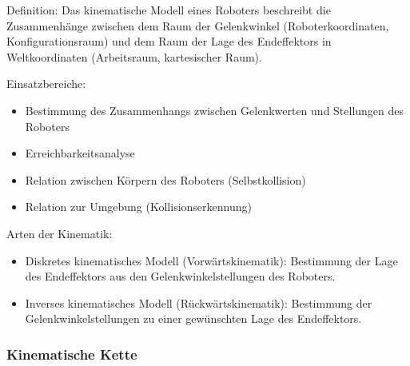 \documentclass[paper=a4, fontsize=11pt]{scrartcl} %
\numberwithin{equation}{section} %
\numberwithin{figure}{section} %
\numberwithin{table}{section} %
\begin{document}
Definition: Das kinematische Modell eines Roboters beschreibt die Zusammenhänge zwischen dem Raum der Gelenkwinkel (Roboterkoordinaten, Konfigurationsraum) und dem Raum der Lage des Endeffektors in Weltkoordinaten (Arbeitsraum, kartesischer Raum).

Einsatzbereiche:
\begin{itemize}
\item Bestimmung des Zusammenhangs zwischen Gelenkwerten und Stellungen des Roboters
\item Erreichbarkeitsanalyse
\item Relation zwischen Körpern des Roboters (Selbstkollision)
\item Relation zur Umgebung (Kollisionserkennung)
\end{itemize}

Arten der Kinematik:
\begin{itemize}
\item Diskretes kinematisches Modell (Vorwärtskinematik): Bestimmung der Lage des Endeffektors aus den Gelenkwinkelstellungen des Roboters.
\item Inverses kinematisches Modell (Rückwärtskinematik): Bestimmung der Gelenkwinkelstellungen zu einer gewünschten Lage des Endeffektors.
\end{itemize}

\subsubsection{Kinematische Kette}
\end{document}
